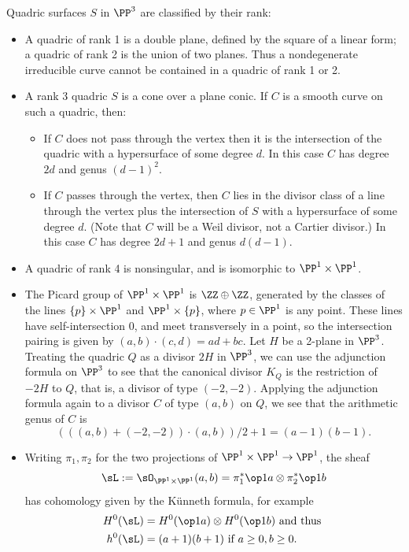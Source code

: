 \begin{example}[Quadrics in $\PP^3$]\label{Div of quadric}
 
Quadric surfaces $S$ in $\PP^3$ are classified by their rank:
\begin{itemize}
\item A quadric of rank 1 is a double plane, defined by the square of a linear form;
a quadric of rank 2 is the union of two planes. Thus a nondegenerate irreducible curve cannot be contained in a quadric of rank 1 or 2.
\item A rank 3 quadric $S$ is a cone over a plane conic. If $C$ is a smooth
curve on such a quadric, then:
\begin{itemize}
\item  If $C$  does
not pass through the vertex then it is the intersection of the quadric with a hypersurface of some
degree $d$. In this case $C$ has degree $2d$ and genus $(d-1)^2$. 
 \item If $C$ passes through the vertex, then $C$ lies in the divisor class of a line through the vertex plus the intersection of $S$ with a hypersurface of some degree $d$. (Note that $C$ will be a Weil divisor, not a Cartier divisor.) In this case $C$ has degree $2d+1$ and 
 genus $d(d-1)$. 
\end{itemize}


\item A quadric of rank 4 is nonsingular, and is isomorphic to $\PP^1\times \PP^1$.

\item The Picard group of $\PP^1\times \PP^1$ is $\ZZ\oplus \ZZ$, generated by the 
classes of the lines $\{p\}\times \PP^1$ and $\PP^1\times \{p\}$, where $p\in \PP^1$
is any point. These lines have self-intersection 0, and meet transversely in a point,
so the intersection pairing is given by $(a,b)\cdot(c,d) = ad+bc$. Let $H$ be a 2-plane in $\PP^3$.
Treating 
the quadric $Q$ as a divisor $2H$ in $\PP^3$, we can use the adjunction formula on $\PP^3$
to see that the canonical divisor $K_Q$ is the restriction of $-2H$ to $Q$, that is, a divisor of type $(-2,-2)$.
Applying the adjunction formula again to a divisor $C$ of type $(a,b)$ on $Q$, we see
that the arithmetic genus of $C$ is
$$
\left(((a,b)+(-2,-2))\cdot (a,b)\right)/2 +1 = (a-1)(b-1).
$$

\item Writing $\pi_1, \pi_2$ for the two projections of
$\PP^1\times \PP^1 \to \PP^1$, the sheaf 
$$
\sL := \sO_{\PP^1\times \PP^1}(a,b) = \pi_1^*\op1a \otimes \pi_2^*\op1b
$$
has cohomology given by the K\"unneth formula, for example
\begin{align*}
 H^0(\sL) &= H^0(\op1a)\otimes H^0(\op1b) \hbox{ and thus }\\
 h^0(\sL) &= (a+1)(b+1) \hbox{ if } a\geq 0, b\geq 0.
\end{align*}


\end{itemize}
\end{example}

